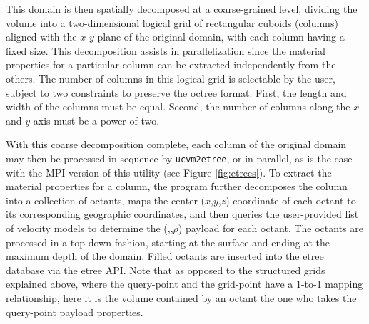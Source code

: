 

This domain is then spatially decomposed at a coarse-grained level, dividing the volume into a two-dimensional logical grid of rectangular cuboids (columns) aligned with the $x$-$y$ plane of the original domain, with each column having a fixed size. This decomposition assists in parallelization since the material properties for a particular column can be extracted independently from the others. The number of columns in this logical grid is selectable by the user, subject to two constraints to preserve the octree format. First, the length and width of the columns must be equal. Second, the number of columns along the $x$ and $y$ axis must be a power of two.

With this coarse decomposition complete, each column of the original domain may then be processed in sequence by \texttt{ucvm2etree}, or in parallel, as is the case with the MPI version of this utility (see Figure \ref{fig:etrees}). To extract the material properties for a column, the program further decomposes the column into a collection of octants, maps the center ($x$,$y$,$z$) coordinate of each octant to its corresponding geographic coordinates, and then queries the user-provided list of velocity models to determine the (\vp{},\vs{},$\rho$) payload for each octant. The octants are processed in a top-down fashion, starting at the surface and ending at the maximum depth of the domain. Filled octants are inserted into the etree database via the etree API. Note that as opposed to the structured grids explained above, where the query-point and the grid-point have a 1-to-1 mapping relationship, here it is the volume contained by an octant the one who takes the query-point payload properties.

